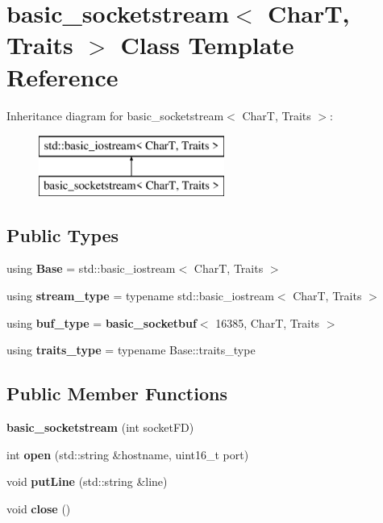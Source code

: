 \section{basic\+\_\+socketstream$<$ CharT, Traits $>$ Class Template Reference}
\label{classbasic__socketstream}
Inheritance diagram for basic\+\_\+socketstream$<$ CharT, Traits $>$\+:\begin{figure}[H]
\begin{center}
\leavevmode
\includegraphics[height=2.000000cm]{classbasic__socketstream}
\end{center}
\end{figure}
\subsection*{Public Types}
\begin{DoxyCompactItemize}
\item 
\mbox{\label{classbasic__socketstream_adb5582d64499000675dcf740d2216cf8}} 
using {\bfseries Base} = std\+::basic\+\_\+iostream$<$ CharT, Traits $>$
\item 
\mbox{\label{classbasic__socketstream_a575a4a139b37915fd4125d43aa99f7f4}} 
using {\bfseries stream\+\_\+type} = typename std\+::basic\+\_\+iostream$<$ CharT, Traits $>$
\item 
\mbox{\label{classbasic__socketstream_ab428099dffca113eea3696698bc51995}} 
using {\bfseries buf\+\_\+type} = \textbf{ basic\+\_\+socketbuf}$<$ 16385, CharT, Traits $>$
\item 
\mbox{\label{classbasic__socketstream_a1af704e520f5d74d38c2ad9a329108fe}} 
using {\bfseries traits\+\_\+type} = typename Base\+::traits\+\_\+type
\end{DoxyCompactItemize}
\subsection*{Public Member Functions}
\begin{DoxyCompactItemize}
\item 
\mbox{\label{classbasic__socketstream_af9b6960e4f1097496c010aa055ded213}} 
{\bfseries basic\+\_\+socketstream} (int socket\+FD)
\item 
\mbox{\label{classbasic__socketstream_a1548cb11bd58c94221c761aacb241c12}} 
int {\bfseries open} (std\+::string \&hostname, uint16\+\_\+t port)
\item 
\mbox{\label{classbasic__socketstream_a5dd63464ac3c17b2e9231bbd8f23e8f2}} 
void {\bfseries put\+Line} (std\+::string \&line)
\item 
\mbox{\label{classbasic__socketstream_aff3c8932400a50d393f0acb95ff0f38f}} 
void {\bfseries close} ()
\end{DoxyCompactItemize}
